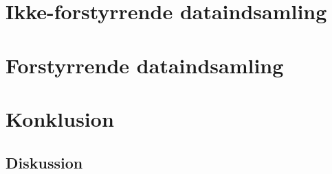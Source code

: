 



\part{Ikke-forstyrrende dataindsamling}\label{ikke_forstyrrende}



\part{Forstyrrende dataindsamling}\label{forstyrrende}




\part{Konklusion}


\chapter{Diskussion}





\printbibliography[heading=bibintoc]

